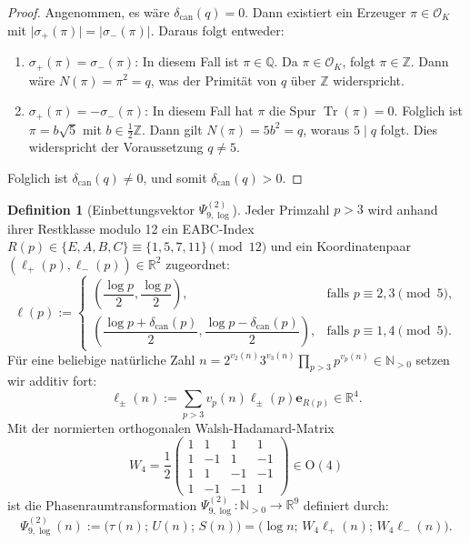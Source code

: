 \documentclass[11pt,a4paper]{article}
\theoremstyle{plain}
\theoremstyle{definition}
\newtheorem{definition}[theorem]{Definition}
\newcommand{\N}{\mathbb{N}}
\newcommand{\Z}{\mathbb{Z}}
\newcommand{\Q}{\mathbb{Q}}
\newcommand{\R}{\mathbb{R}}
\newcommand{\OK}{\mathcal{O}_K}
\DeclareMathOperator{\Tr}{Tr}
\begin{document}
\begin{proof}
Angenommen, es wäre $\delta_{\mathrm{can}}(q) = 0$. Dann existiert ein Erzeuger $\pi \in \OK$ mit $\vert{}\sigma_+(\pi)\vert{} = \vert{}\sigma_-(\pi)\vert{}$. Daraus folgt entweder:
\begin{enumerate}
    \item $\sigma_+(\pi) = \sigma_-(\pi)$: In diesem Fall ist $\pi \in \Q$. Da $\pi \in \OK$, folgt $\pi \in \Z$. Dann wäre $N(\pi) = \pi^2 = q$, was der Primität von $q$ über $\Z$ widerspricht.
    \item $\sigma_+(\pi) = -\sigma_-(\pi)$: In diesem Fall hat $\pi$ die Spur $\Tr(\pi) = 0$. Folglich ist $\pi = b\sqrt{5}$ mit $b \in \frac{1}{2}\Z$. Dann gilt $N(\pi) = 5b^2 = q$, woraus $5 \mid q$ folgt. Dies widerspricht der Voraussetzung $q \neq 5$.
\end{enumerate}
Folglich ist $\delta_{\mathrm{can}}(q) \neq 0$, und somit $\delta_{\mathrm{can}}(q) > 0$.
\end{proof}

\begin{definition}[Einbettungsvektor $\Psi_{9,\log}^{(2)}$]
Jeder Primzahl $p > 3$ wird anhand ihrer Restklasse modulo 12 ein EABC-Index $R(p) \in \{E, A, B, C\} \equiv \{1, 5, 7, 11\} \pmod{12}$ und ein Koordinatenpaar $(\ell_+(p), \ell_-(p)) \in \R^2$ zugeordnet:
\begin{equation}
    \ell(p) := 
    \begin{cases}
        \left(\dfrac{\log p}{2}, \dfrac{\log p}{2}\right), & \text{falls } p \equiv 2, 3 \pmod 5,\\[1em]
        \left(\dfrac{\log p + \delta_{\mathrm{can}}(p)}{2}, \dfrac{\log p - \delta_{\mathrm{can}}(p)}{2}\right), & \text{falls } p \equiv 1, 4 \pmod 5.
    \end{cases}
\end{equation}
Für eine beliebige natürliche Zahl $n = 2^{v_2(n)} 3^{v_3(n)} \prod_{p > 3} p^{v_p(n)} \in \N_{>0}$ setzen wir additiv fort:
\begin{equation}
    \boldsymbol{\ell}_\pm(n) := \sum_{p > 3} v_p(n) \ell_\pm(p) \mathbf{e}_{R(p)} \in \R^4.
\end{equation}
Mit der normierten orthogonalen Walsh-Hadamard-Matrix
\begin{equation}
    W_4 = \frac{1}{2} \begin{pmatrix}
        1 &  1 &  1 &  1 \\
        1 & -1 &  1 & -1 \\
        1 &  1 & -1 & -1 \\
        1 & -1 & -1 &  1
    \end{pmatrix} \in \mathrm{O}(4)
\end{equation}
ist die Phasenraumtransformation $\Psi_{9,\log}^{(2)}: \N_{>0} \to \R^9$ definiert durch:
\begin{equation}
    \Psi_{9,\log}^{(2)}(n) := \bigl(\tau(n);\, U(n);\, S(n)\bigr) = \bigl(\log n;\, W_4 \boldsymbol{\ell}_+(n);\, W_4 \boldsymbol{\ell}_-(n)\bigr).
\end{equation}
\end{definition}
\end{document}

